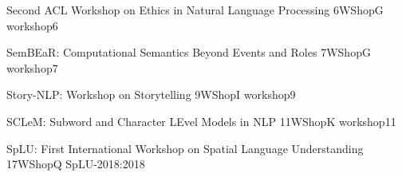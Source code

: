  \begin{wsschedule}
   {Second ACL Workshop on Ethics in Natural Language Processing}
   {6}{WShopG}
   {workshop6}
   {\WShopLocG}
   
 \end{wsschedule}


%   

\begin{wsschedule}
  {SemBEaR: Computational Semantics Beyond Events and Roles}
  {7}{WShopG}
  {workshop7}
  {\WShopLocG}
  
\end{wsschedule}

%   

\begin{wsschedule}
  {Story-NLP: Workshop on Storytelling}
  {9}{WShopI}
  {workshop9}
  {\WShopLocI}
  
\end{wsschedule}

%   


\begin{wsschedule}
  {SCLeM: Subword and Character LEvel Models in NLP}
  {11}{WShopK}
  {workshop11}
  {\WShopLocK}
  
\end{wsschedule}

 \begin{wsschedule}
   {SpLU: First International Workshop on Spatial Language Understanding}
   {17}{WShopQ}
{SpLU-2018:2018}
   {\WShopLocO}
   
 \end{wsschedule}

